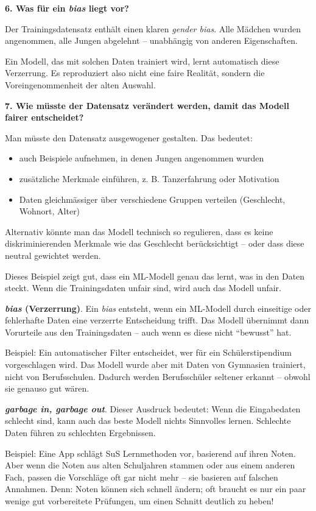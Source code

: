 \begin{aufgabe}{6}
\vspace{0.5em}
\textbf{6. Was für ein \textit{bias} liegt vor?}

Der Trainingsdatensatz enthält einen klaren \textit{gender bias}. Alle Mädchen wurden angenommen, alle Jungen abgelehnt – unabhängig von anderen Eigenschaften.

Ein Modell, das mit solchen Daten trainiert wird, lernt automatisch diese Verzerrung. Es reproduziert also nicht eine faire Realität, sondern die Voreingenommenheit der alten Auswahl.

\vspace{0.5em}
\textbf{7. Wie müsste der Datensatz verändert werden, damit das Modell fairer entscheidet?}

Man müsste den Datensatz ausgewogener gestalten. Das bedeutet:

\begin{itemize}
  \item auch Beispiele aufnehmen, in denen Jungen angenommen wurden
  \item zusätzliche Merkmale einführen, z. B. Tanzerfahrung oder Motivation
  \item Daten gleichmässiger über verschiedene Gruppen verteilen (Geschlecht, Wohnort, Alter)
\end{itemize}

Alternativ könnte man das Modell technisch so regulieren, dass es keine diskriminierenden Merkmale wie das Geschlecht berücksichtigt – oder dass diese neutral gewichtet werden.

Dieses Beispiel zeigt gut, dass ein ML-Modell genau das lernt, was in den Daten steckt. Wenn die Trainingsdaten unfair sind, wird auch das Modell unfair.

\end{aufgabe}

\begin{aufgabe}{7}

\textbf{\textit{bias} (Verzerrung)}.
Ein \textit{bias} entsteht, wenn ein ML-Modell durch einseitige oder fehlerhafte Daten eine verzerrte Entscheidung trifft. Das Modell übernimmt dann Vorurteile aus den Trainingsdaten – auch wenn es diese nicht ``bewusst'' hat.

Beispiel: Ein automatischer Filter entscheidet, wer für ein Schülerstipendium vorgeschlagen wird. Das Modell wurde aber mit Daten von Gymnasien trainiert, nicht von Berufsschulen. Dadurch werden Berufsschüler seltener erkannt – obwohl sie genauso gut wären.


\textbf{\textit{garbage in, garbage out}}.
Dieser Ausdruck bedeutet: Wenn die Eingabedaten schlecht sind, kann auch das beste Modell nichts Sinnvolles lernen. Schlechte Daten führen zu schlechten Ergebnissen.

Beispiel: Eine App schlägt SuS Lernmethoden vor, basierend auf ihren Noten. Aber wenn die Noten aus alten Schuljahren stammen oder aus einem anderen Fach, passen die Vorschläge oft gar nicht mehr – sie basieren auf falschen Annahmen. Denn: Noten können sich schnell ändern; oft braucht es nur ein paar wenige gut vorbereitete Prüfungen, um einen Schnitt deutlich zu heben!

\end{aufgabe}


